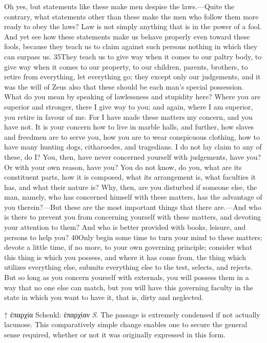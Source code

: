 Oh yes, but statements like these make men despise the laws.—Quite the contrary, what statements other than these make the men who follow them more ready to obey the laws? Law is not simply anything that is in the power of a fool. And yet see how these statements make us behave properly even toward these fools, because they teach us to claim against such persons nothing in which they can surpass us. 35They teach us to give way when it comes to our paltry body, to give way when it comes to our property, to our children, parents, brothers, to retire from everything, let everything go; they except only our judgements, and it was the will of Zeus also that these should be each man's special possession. What do you mean by speaking of lawlessness and stupidity here? Where you are superior and stronger, there I give way to you; and again, where I am superior, you retire in favour of me. For I have made these matters my concern, and you have not. It is your concern how to live in marble halls, and further, how slaves and freedmen are to serve you, how you are to wear conspicuous clothing, how to have many hunting dogs, citharoedes, and tragedians. I do not lay claim to any of these, do I? You, then, have never concerned yourself with judgements, have you? Or with your own reason, have you? You do not know, do you, what are its constituent parts, how it is composed, what its arrangement is, what faculties it has, and what their nature is? Why, then, are you disturbed if someone else, the man, namely, who has concerned himself with these matters, has the advantage of you therein?—But these are the most important things that there are.—And who is there to prevent you from concerning yourself with these matters, and devoting your attention to them? And who is better provided with books, leisure, and persons to help you? 40Only begin some time to turn your mind to these matters; devote a little time, if no more, to your own governing principle; consider what this thing is which you possess, and where it has come from, the thing which utilizes everything else, submits everything else to the test, selects, and rejects. But so long as you concern yourself with externals, you will possess them in a way that no one else can match, but you will have this governing faculty in the state in which you want to have it, that is, dirty and neglected.



↑ ἐπαρχία Schenkl: ἐπαρχίαν \emph{S}. The passage is extremely condensed if not actually lacunose. This comparatively simple change enables one to secure the general sense required, whether or not it was originally expressed in this form.

